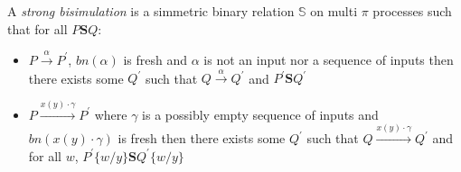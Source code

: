 \begin{definition}
  A \emph{strong bisimulation} is a simmetric binary relation $\mathbb{S}$ on multi $\pi$ processes such that for all $P\mathbf{S}Q$:
   \begin{itemize}
     \item 
       $P \xrightarrow{\alpha} P^{'}$, $bn(\alpha)$ is fresh and $\alpha$ is not an input nor a sequence of inputs then there exists some $Q^{'}$ such that $Q \xrightarrow{\alpha} Q^{'}$ and $P^{'}\mathbf{S}Q^{'}$
     \item
       $P \xrightarrow{x(y) \cdot \gamma} P^{'}$ where $\gamma$ is a possibly empty sequence of inputs and $bn(x(y) \cdot \gamma)$ is fresh then there exists some $Q^{'}$ such that $Q \xrightarrow{x(y) \cdot \gamma} Q^{'}$ and for all $w$, $P^{'}\{w/y\}\mathbf{S}Q^{'}\{w/y\}$
  \end{itemize}
\end{definition}

% 

